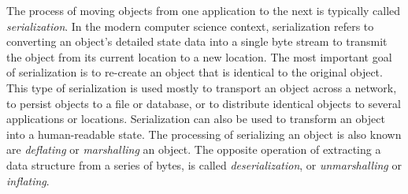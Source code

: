 \documentclass[11pt,relax]{SANDreport}
\begin{document}
The process of moving objects from one application to the next is
typically called {\sl serialization}.
In the modern computer science context, serialization refers to
converting an object's detailed state data into a single byte stream to
transmit the object from its current location to a new location.  The most
important goal of serialization is to re-create an object that is identical to
the original object. This type of serialization is used mostly to transport an
object across a network, to persist objects to a file or database, or to
distribute identical objects to several applications or locations.
Serialization can also be used to transform an object into a human-readable
state.
The processing of serializing an object is also known are {\sl deflating} or
{\sl marshalling} an object. The opposite operation of extracting a data
structure from a series of bytes, is called {\sl deserialization}, or {\sl
  unmarshalling} or {\sl inflating}.

\smallskip
\end{document}
